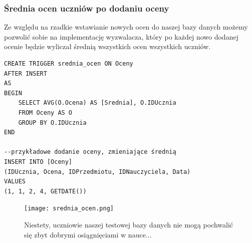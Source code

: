 \documentclass[60pt]{article}
\begin{document}
\subsubsection{Średnia ocen uczniów po dodaniu oceny}

Ze względu na rzadkie wstawianie nowych ocen do naszej bazy danych możemy pozwolić sobie na implementację wyzwalacza, który po każdej nowo dodanej ocenie będzie wyliczał średnią wszystkich ocen wszystkich uczniów.

\begin{verbatim}
CREATE TRIGGER srednia_ocen ON Oceny
AFTER INSERT
AS
BEGIN
    SELECT AVG(O.Ocena) AS [Srednia], O.IDUcznia 
    FROM Oceny AS O
    GROUP BY O.IDUcznia
END

--przykładowe dodanie oceny, zmieniające średnią
INSERT INTO [Oceny]
(IDUcznia, Ocena, IDPrzedmiotu, IDNauczyciela, Data)
VALUES
(1, 1, 2, 4, GETDATE())
\end{verbatim}

\begin{figure}[h]
\begin{center}
  \texttt{[image: srednia\_ocen.png]}
  \caption{Niestety, uczniowie naszej testowej bazy danych nie mogą pochwalić się zbyt dobrymi osiągnięciami w nauce...}
  \label{Niestety, uczniowie naszej testowej bazy danych nie mogą pochwalić się zbyt dobrymi osiągnięciami w nauce...}
  \end{center}
\end{figure}
\end{document}
